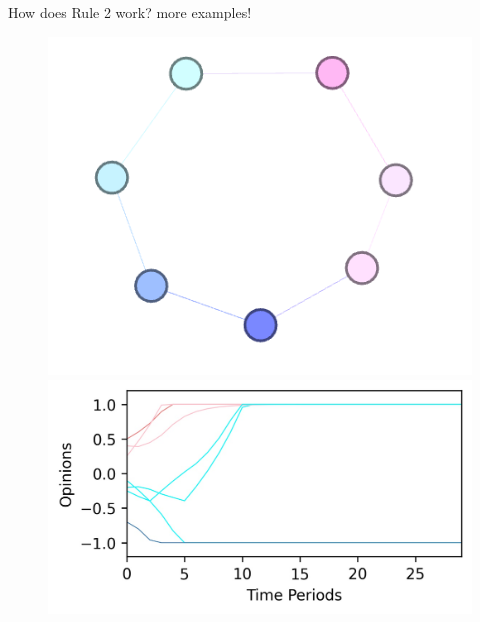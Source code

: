 \documentclass[xcolor=table]{beamer}
\begin{document}
\begin{frame}{How does Rule 2 work? more examples! }
%
\begin{figure}
\centering
\begin{minipage}{.5\textwidth}
  \centering
  \includegraphics[scale = 0.55]{./img/ideo_non_monotonic.png}
\end{minipage}%
\begin{minipage}{.5\textwidth}
  \centering
  \includegraphics[scale = 0.55]{./img/plot_ideo_opposed_non_monotonic.jpg}
\end{minipage}
\end{figure}
\end{frame}
%
\end{document}
